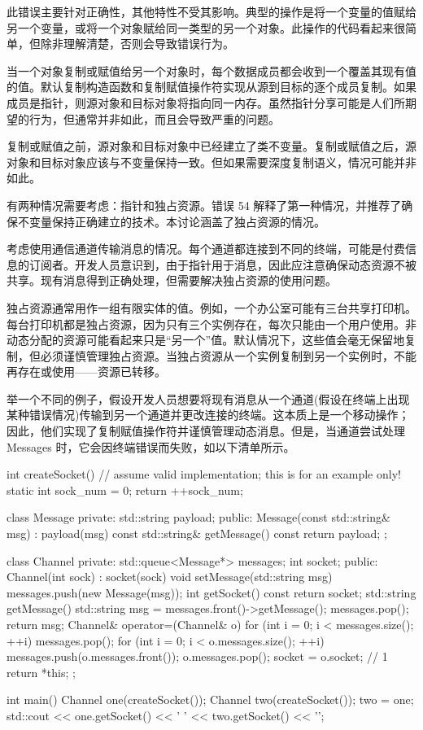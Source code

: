 此错误主要针对正确性，其他特性不受其影响。典型的操作是将一个变量的值赋给另一个变量，或将一个对象赋给同一类型的另一个对象。此操作的代码看起来很简单，但除非理解清楚，否则会导致错误行为。

当一个对象复制或赋值给另一个对象时，每个数据成员都会收到一个覆盖其现有值的值。默认复制构造函数和复制赋值操作符实现从源到目标的逐个成员复制。如果成员是指针，则源对象和目标对象将指向同一内存。虽然指针分享可能是人们所期望的行为，但通常并非如此，而且会导致严重的问题。


复制或赋值之前，源对象和目标对象中已经建立了类不变量。复制或赋值之后，源对象和目标对象应该与不变量保持一致。但如果需要深度复制语义，情况可能并非如此。

有两种情况需要考虑：指针和独占资源。错误 54 解释了第一种情况，并推荐了确保不变量保持正确建立的技术。本讨论涵盖了独占资源的情况。

考虑使用通信通道传输消息的情况。每个通道都连接到不同的终端，可能是付费信息的订阅者。开发人员意识到，由于指针用于消息，因此应注意确保动态资源不被共享。现有消息得到正确处理，但需要解决独占资源的使用问题。

独占资源通常用作一组有限实体的值。例如，一个办公室可能有三台共享打印机。每台打印机都是独占资源，因为只有三个实例存在，每次只能由一个用户使用。非动态分配的资源可能看起来只是“另一个”值。默认情况下，这些值会毫无保留地复制，但必须谨慎管理独占资源。当独占资源从一个实例复制到另一个实例时，不能再存在或使用——资源已转移。

举一个不同的例子，假设开发人员想要将现有消息从一个通道(假设在终端上出现某种错误情况)传输到另一个通道并更改连接的终端。这本质上是一个移动操作；因此，他们实现了复制赋值操作符并谨慎管理动态消息。但是，当通道尝试处理 Messages 时，它会因终端错误而失败，如以下清单所示。


\begin{cpp}
int createSocket() {
  // assume valid implementation; this is for an example only!
  static int sock_num = 0;
  return ++sock_num;
}

class Message {
  private:
  std::string payload;
  public:
  Message(const std::string& msg) : payload(msg) {}
  const std::string& getMessage() const { return payload; }
};

class Channel {
private:
  std::queue<Message*> messages;
  int socket;
public:
  Channel(int sock) : socket(sock) {}
  void setMessage(std::string msg) { messages.push(new Message(msg)); }
  int getSocket() const { return socket; }
  std::string getMessage() {
    std::string msg = messages.front()->getMessage();
    messages.pop();
    return msg;
  }
  Channel& operator=(Channel& o) {
    for (int i = 0; i < messages.size(); ++i)
      messages.pop();
    for (int i = 0; i < o.messages.size(); ++i) {
      messages.push(o.messages.front());
      o.messages.pop();
    }
    socket = o.socket; // 1
    return *this;
  }
};

int main() {
  Channel one(createSocket());
  Channel two(createSocket());
  two = one;
  std::cout << one.getSocket() << ' ' << two.getSocket() << '\n';
}
\end{cpp}

